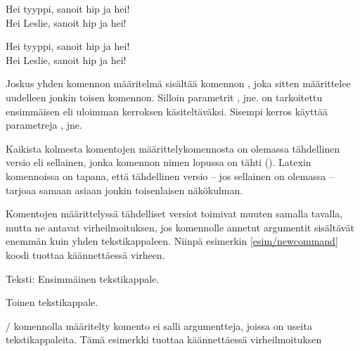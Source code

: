 \begin{koodilohkosis}
\newcommand{\komento}[3][tyyppi]{Hei #1, sanoit #2 ja #3!}
\komento{hip}{hei} \\
\komento[Leslie]{hip}{hei}
\end{koodilohkosis}

\begin{tulossis}
  Hei tyyppi, sanoit hip ja hei! \\
  Hei Leslie, sanoit hip ja hei!
\end{tulossis}

\noindent
Joskus yhden komennon määritelmä sisältää komennon
, joka sitten määrittelee uudelleen jonkin toisen
komennon. Silloin parametrit ,  jne. on
tarkoitettu ensimmäisen eli uloimman kerroksen käsiteltäväksi. Sisempi
kerros käyttää parametreja ,  jne.

Kaikista kolmesta komentojen määrittelykomennosta on olemassa
tähdellinen versio eli sellainen, jonka komennon nimen lopussa on tähti
(\koodi{*}). Latexin komennoissa on tapana, että tähdellinen versio --
jos sellainen on olemassa -- tarjoaa samaan asiaan jonkin toisenlaisen
näkökulman.

\begin{koodilohkosis}
\newcommand*     {\nimi}[n][oletus]{määritelmä}
\renewcommand*   {\nimi}[n][oletus]{määritelmä}
\providecommand* {\nimi}[n][oletus]{määritelmä}
\end{koodilohkosis}

\noindent
Komentojen määrittelyssä tähdelliset versiot toimivat muuten samalla
tavalla, mutta ne antavat virheilmoituksen, jos komennolle annetut
argumentit sisältävät enemmän kuin yhden tekstikappaleen. Niinpä
esimerkin \ref{esim/newcommand} koodi tuottaa käännettäessä virheen.

\begin{esimerkki*}
\begin{koodilohko}
\newcommand*{\komento}[1]{Teksti: #1}

\komento{
  Ensimmäinen tekstikappale.

  Toinen tekstikappale.
}
\end{koodilohko}
  \caption{\-/ komennolla määritelty komento ei
    salli argumentteja, joissa on useita tekstikappaleita. Tämä
    esimerkki tuottaa käännettäessä virheilmoituksen}
  \label{esim/newcommand}
\end{esimerkki*}

